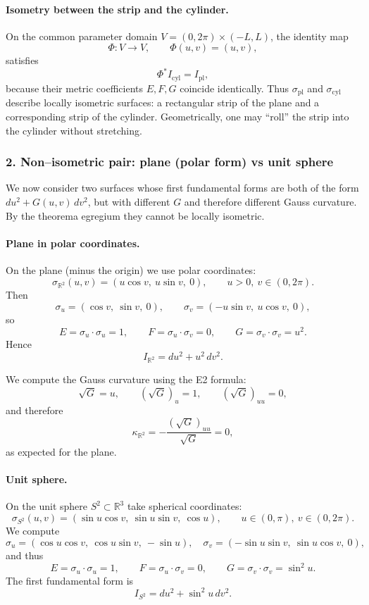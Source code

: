 \documentclass[12pt,a4paper]{article}
\theoremstyle{plain}
\theoremstyle{definition}      %
\begin{document}
\paragraph{Isometry between the strip and the cylinder.}
On the common parameter domain $V=(0,2\pi)\times(-L,L)$,
the identity map
\[
\Phi:V\to V,\qquad \Phi(u,v)=(u,v),
\]
satisfies
\[
\Phi^{*}I_{\mathrm{cyl}}=I_{\mathrm{pl}},
\]
because their metric coefficients $E,F,G$ coincide identically.  Thus
$\sigma_{\mathrm{pl}}$ and $\sigma_{\mathrm{cyl}}$ describe locally isometric
surfaces: a rectangular strip of the plane and a corresponding strip of the
cylinder.  Geometrically, one may ``roll'' the strip into the cylinder
without stretching.

\medskip

\subsubsection*{2. Non--isometric pair: plane (polar form) vs unit sphere}

We now consider two surfaces whose first fundamental forms are both of the
form $du^{2}+G(u,v)\,dv^{2}$, but with different $G$ and therefore different
Gauss curvature.  By the theorema egregium they cannot be locally isometric.

\paragraph{Plane in polar coordinates.}
On the plane (minus the origin) we use polar coordinates:
\[
\sigma_{\mathbb{R}^{2}}(u,v) = (u\cos v,\ u\sin v,\ 0),
\qquad u>0,\ v\in(0,2\pi).
\]
Then
\[
\sigma_{u} = (\cos v,\ \sin v,\ 0),\qquad
\sigma_{v} = (-u\sin v,\ u\cos v,\ 0),
\]
so
\[
E = \sigma_{u}\cdot\sigma_{u} = 1,\qquad
F = \sigma_{u}\cdot\sigma_{v} = 0,\qquad
G = \sigma_{v}\cdot\sigma_{v} = u^{2}.
\]
Hence
\[
I_{\mathbb{R}^{2}} = du^{2} + u^{2}\,dv^{2}.
\]

We compute the Gauss curvature using the E2 formula:
\[
\sqrt{G}=u,\qquad (\sqrt{G})_{u}=1,\qquad (\sqrt{G})_{uu}=0,
\]
and therefore
\[
\kappa_{\mathbb{R}^{2}}
= -\frac{(\sqrt{G})_{uu}}{\sqrt{G}}
= 0,
\]
as expected for the plane.

\paragraph{Unit sphere.}
On the unit sphere $S^{2}\subset\mathbb{R}^{3}$ take spherical coordinates:
\[
\sigma_{S^{2}}(u,v)
= (\sin u\cos v,\ \sin u\sin v,\ \cos u),
\qquad u\in(0,\pi),\ v\in(0,2\pi).
\]
We compute
\[
\sigma_{u} = (\cos u\cos v,\ \cos u\sin v,\ -\sin u),\quad
\sigma_{v} = (-\sin u\sin v,\ \sin u\cos v,\ 0),
\]
and thus
\[
E = \sigma_{u}\cdot\sigma_{u} = 1,\qquad
F = \sigma_{u}\cdot\sigma_{v} = 0,\qquad
G = \sigma_{v}\cdot\sigma_{v} = \sin^{2}u.
\]
The first fundamental form is
\[
I_{S^{2}} = du^{2} + \sin^{2}u\,dv^{2}.
\]
\end{document}
